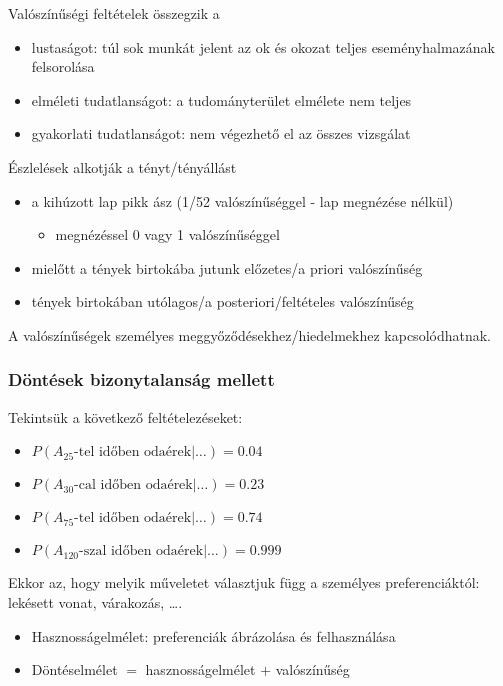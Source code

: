 Valószínűségi feltételek összegzik a
\begin{itemize}
    \item lustaságot: túl sok munkát jelent az ok és okozat teljes
        eseményhalmazának felsorolása
    \item elméleti tudatlanságot: a tudományterület elmélete nem teljes
    \item gyakorlati tudatlanságot: nem végezhető el az összes vizsgálat
\end{itemize}

Észlelések alkotják a tényt/tényállást
\begin{itemize}
    \item a kihúzott lap pikk ász (1/52 valószínűséggel - lap megnézése nélkül)
    \begin{itemize}
        \item megnézéssel 0 vagy 1 valószínűséggel
    \end{itemize}
    \item mielőtt a tények birtokába jutunk előzetes/a priori valószínűség
    \item tények birtokában utólagos/a posteriori/feltételes valószínűség
\end{itemize}

A valószínűségek személyes meggyőződésekhez/hiedelmekhez kapcsolódhatnak.

\subsubsection{Döntések bizonytalanság mellett}

Tekintsük a következő feltételezéseket:
\begin{itemize}
    \item $P(A_{25} \text{-tel időben odaérek|\ldots}) = 0.04$
    \item $P(A_{30} \text{-cal időben odaérek|\ldots}) = 0.23$
    \item $P(A_{75} \text{-tel időben odaérek|\ldots}) = 0.74$
    \item $P(A_{120} \text{-szal időben odaérek|\ldots}) = 0.999$
\end{itemize}

Ekkor az, hogy melyik műveletet választjuk függ a személyes preferenciáktól:
lekésett vonat, várakozás, \ldots.

\begin{itemize}
    \item Hasznosságelmélet: preferenciák ábrázolása és felhasználása
    \item Döntéselmélet $=$ hasznosságelmélet  $+$ valószínűség
\end{itemize}

